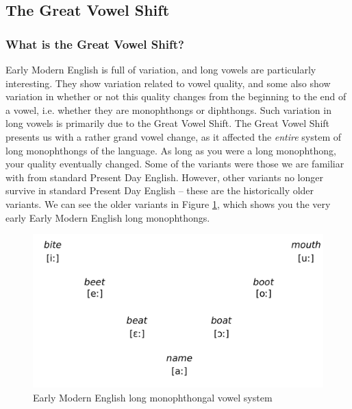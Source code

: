 \subsection{The Great Vowel Shift}\label{EModE-GVS}
\subsubsection{What is the Great Vowel Shift?}
Early Modern English is full of variation, and long vowels are particularly interesting. They show variation related to vowel quality, and some also show variation in whether or not this quality changes from the beginning to the end of a vowel, i.e. whether they are monophthongs or diphthongs. Such variation in long vowels is primarily due to the Great Vowel Shift. The Great Vowel Shift presents us with a rather grand vowel change, as it affected the \textit{entire} system of long monophthongs of the language. As long as you were a long monophthong, your quality eventually changed. Some of the variants were those we are familiar with from standard Present Day English. However, other variants no longer survive in standard Present Day English -- these are the historically older variants. We can see the older variants in Figure \ref{fig:EModEVowels}, which shows you the very early Early Modern English long monophthongs.

\begin{figure}
        \includegraphics[height=.25\textheight]{chapters/img/EModEVowelsa.pdf}
    \caption{Early Modern English long monophthongal vowel system}
    \label{fig:EModEVowels}
\end{figure}


